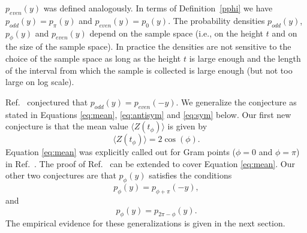 \documentclass[twoside]{article}
\theoremstyle{definition}
\begin{document}
$p_{even}(y)$ was defined analogously. In terms of Definition~\ref{pphi} we have $p_{odd}(y) = p_{\pi}(y)$ and $p_{even}(y) = p_{0}(y)$.
The probability densities $p_{odd}(y)$,  $p_{\phi}(y)$ and $p_{even}(y)$ depend on the sample space (i.e., on the height $t$ and on the size of the sample space). In practice the densities are not sensitive to the choice of the sample space as long as the height $t$ is large enough and the length of the interval from which the sample is collected is large enough (but not too large on log scale).

Ref.~\cite{Shanker 2018} conjectured that $p_{odd}(y) = p_{even}(-y)$. We generalize the conjecture as stated in Equations \ref{eq:mean}, \ref{eq:antisym} and \ref{eq:sym} below.
Our first new conjecture is that the mean value $\langle Z(t_{\phi})\rangle$ is given by
\begin{equation}
\langle Z(t_{\phi})\rangle = 2\cos (\phi).
\label{eq:mean}
\end{equation}
Equation \ref{eq:mean} was explicitly called out for Gram points ($\phi = 0$ and $\phi = \pi$) in Ref.~\cite{Titchmarsh 1986}. The proof of Ref.~\cite{Titchmarsh 1986} can be extended to cover Equation \ref{eq:mean}. Our other two conjectures are that $p_{\phi}(y)$ satisfies the conditions
\begin{equation}
p_{\phi}(y) = p_{\phi+\pi}(-y),
\label{eq:antisym}
\end{equation}
and
\begin{equation}
p_{\phi}(y) = p_{2\pi-\phi}(y).
\label{eq:sym}
\end{equation}
The empirical evidence for these generalizations is given in the next section.
\end{document}
